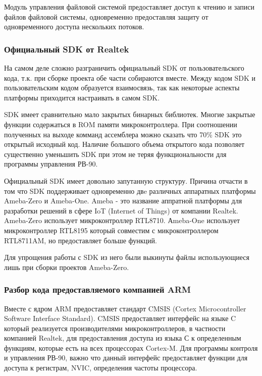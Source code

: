 Модуль управления файловой системой предоставляет доступ к чтению и записи файлов файловой системы, одновременно предоставляя защиту от одновременного доступа нескольких потоков. 


\subsubsection{ Официальный SDK от Realtek}
На самом деле сложно разграничить официальный SDK от пользовательского кода, т.к. при сборке проекта обе части собираются вместе.
Между кодом SDK и пользовательским кодом образуется взаимосвязь, так как некоторые аспекты платформы приходится настраивать в самом SDK.

SDK имеет сравнительно мало закрытых бинарных библиотек. Многие закрытые функции содержаться в ROM памяти микроконтроллера. 
При соотношении полученных на выходе комманд ассемблера можно сказать что 70\% SDK это открытый исходный код. Наличие большого объема открытого кода позволяет существенно уменьшить SDK при этом не теряя функциональности для программы управления РВ-90.   

Официальный SDK имеет довольно запутанную структуру. Причина отчасти в том что SDK поддерживает одновременно двe различных аппаратных платформы Ameba-Zero и Ameba-One. Ameba - это название аппратной платформы для разработки решений в сфере IoT (Internet of Things) от компании Realtek. Ameba-Zero использует микроконтроллер RTL8710. Аmeba-One использует микроконтроллер RTL8195 который совместим с микроконтроллером RTL8711AM, но предоставляет больше функций.

Для упрощения работы с SDK из него были выкинуты файлы использующиеся лишь при сборки проектов Ameba-Zero.


\subsubsection{ Разбор кода предоставляемого компанией ARM}
Вместе с ядром ARM предоставляет стандарт CMSIS  (Cortex Microcontroller Software Interface Standard).
CMSIS предоставляет интерфейс на языке C который реализуется производителями микроконтроллеров, в частности компанией Realtek, для предоставления доступа из языка С к определенным функциям, которые есть на всех процессорах Cortex-M. Для программы контроля и управления РВ-90, важно что данный интерфейс предоставляет функции для доступа к регистрам, NVIC, определения частоты процессора.

